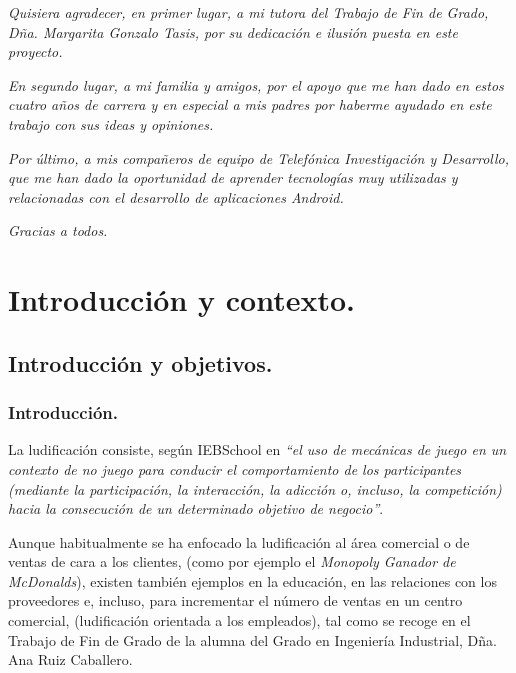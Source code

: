 \documentclass[twoside]{report}
\begin{document}
\begin{flushright}
\textit{Quisiera agradecer, en primer lugar, a mi tutora del Trabajo de Fin de Grado, Dña. Margarita Gonzalo Tasis, por su dedicación e ilusión puesta en este proyecto.} \vspace{0.5cm}

\textit{En segundo lugar, a mi familia y amigos, por el apoyo que me han dado en estos cuatro años de carrera y en especial a mis padres por haberme ayudado en este trabajo con sus ideas y opiniones.} \vspace{0.5cm}

\textit{Por último, a mis compañeros de equipo de Telefónica Investigación y Desarrollo, que me han dado la oportunidad de aprender tecnologías muy utilizadas y relacionadas con el desarrollo de aplicaciones Android.} \vspace{0.5cm}

\textit{Gracias a todos.}
\end{flushright}

\newpage
\thispagestyle{empty}
\mbox{}

\clearpage

\tableofcontents

\listoffigures
 
\listoftables

\clearpage



\chapter{Introducción y contexto.}
\section{Introducción y objetivos.}

\subsection{Introducción.}

La ludificación consiste, según IEBSchool \cite{iebschoolGami} en \textit{“el uso de mecánicas de juego en un contexto de no juego para conducir el comportamiento de los participantes (mediante la participación, la interacción, la adicción o, incluso, la competición) hacia la consecución de un determinado objetivo de negocio”}. 

Aunque habitualmente se ha enfocado la ludificación al área comercial o de ventas de cara a los clientes, (como por ejemplo el \cite{monopolymcdo} \textit{Monopoly Ganador de McDonalds}), existen también ejemplos en la educación, en las relaciones con los proveedores e, incluso, para incrementar el número de ventas en un centro comercial, (ludificación orientada a los empleados), tal como se recoge en el Trabajo de Fin de Grado de la alumna del Grado en Ingeniería Industrial, \cite{anatfg} Dña. Ana Ruiz Caballero.
\end{document}
